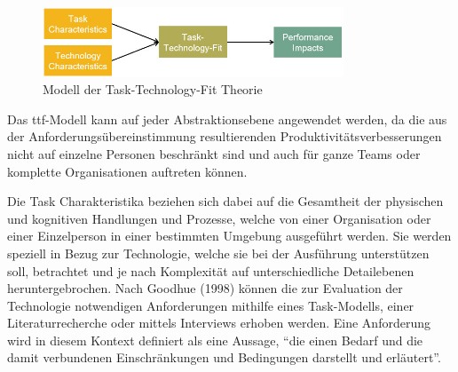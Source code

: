 \begin{figure}[h]
    \centering
    \includegraphics[width=0.8\textwidth]{img/TTF_einfach.jpg}
    \caption[Modell der Task-Technology-Fit Theorie]{Modell der Task-Technology-Fit Theorie\autocite{TTF}}
    \label{fig:TTF}
\end{figure}


Das \acs{ttf}-Modell kann auf jeder Abstraktionsebene angewendet werden, da die aus der Anforderungsübereinstimmung resultierenden Produktivitätsverbesserungen nicht auf einzelne Personen beschränkt sind und auch für ganze Teams oder komplette Organisationen auftreten können.\autocite[Vgl.][S. 1827f]{GOODHUE1995b} 



Die Task Charakteristika beziehen sich dabei auf die Gesamtheit der physischen und kognitiven Handlungen und Prozesse, welche von einer Organisation oder einer Einzelperson in einer bestimmten Umgebung ausgeführt werden. Sie werden speziell in Bezug zur Technologie, welche sie bei der Ausführung unterstützen soll, betrachtet und je nach Komplexität auf unterschiedliche Detailebenen heruntergebrochen. \autocite[Vgl.][S. 398]{SPIES2020} Nach Goodhue (1998) können die zur Evaluation der Technologie notwendigen Anforderungen mithilfe eines Task-Modells, einer Literaturrecherche oder mittels Interviews erhoben werden.\autocite[Vgl.][S. 126]{GOODHUE1998} Eine Anforderung wird in diesem Kontext definiert als eine Aussage, \enquote{die einen Bedarf und die damit verbundenen Einschränkungen und Bedingungen darstellt und erläutert}.\autocite[Vgl.][]{ISO2017}

